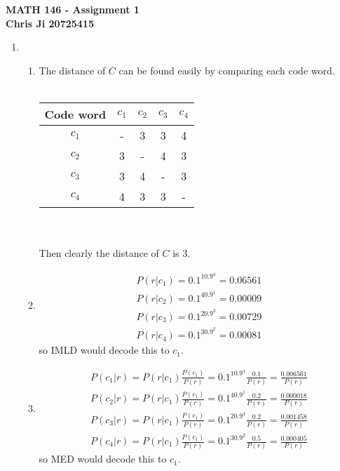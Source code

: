 \documentclass[10pt,english]{article}
\begin{document}
\noindent \begin{center}
\textbf{\large{}MATH 146 - Assignment 1}\\
\textbf{\large{}Chris Ji 20725415}
\par\end{center}{\large \par}
\medskip{}

\begin{enumerate}
\item \begin{enumerate}
    \item The distance of $C$ can be found easily by comparing each code word. \\\\
    \begin{tabular}{|c|c|c|c|c|}
\hline
Code word & $c_1$&$c_2$&$c_3$&$c_4$ \\ \hline
$c_1$      & - & 3 & 3 & 4  \\
$c_2$      & 3 & - & 4 & 3    \\      
$c_3$      & 3 & 4 & - & 3    \\ 
$c_4$      & 4 & 3 & 3 & -    \\
\hline
\end{tabular}\\ \\
Then clearly the distance of $C$ is 3.

    \item \begin{align*}
        P(r|c_1)=0.1^10.9^4= 0.06561\\
        P(r|c_2)=0.1^40.9^1= 0.00009\\
        P(r|c_3)=0.1^20.9^3= 0.00729\\
        P(r|c_4)=0.1^30.9^2= 0.00081
        \end{align*}
        so IMLD would decode this to $c_1$. 
    
    
    \item \begin{align*}
        P(c_1|r)=P(r|c_1)\frac{P(c_1)}{P(r)}=0.1^10.9^4\frac{0.1}{P(r)}=\frac{0.006561}{P(r)}\\
        P(c_2|r)=P(r|c_1)\frac{P(c_1)}{P(r)}=0.1^40.9^1\frac{0.2}{P(r)}=\frac{0.000018}{P(r)}\\
        P(c_3|r)=P(r|c_1)\frac{P(c_1)}{P(r)}=0.1^20.9^3\frac{0.2}{P(r)}=\frac{0.001458}{P(r)}\\
        P(c_4|r)=P(r|c_1)\frac{P(c_1)}{P(r)}=0.1^30.9^2\frac{0.5}{P(r)}=\frac{0.000405}{P(r)}
        \end{align*}
        so MED would decode this to $c_1$. 
    

\end{enumerate}
\end{enumerate}
\end{document}
